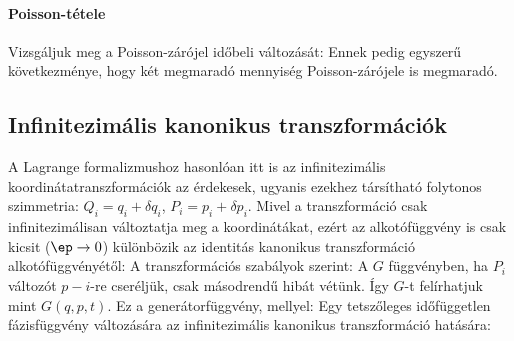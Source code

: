    \paragraph{Poisson-tétele}
   
   Vizsgáljuk meg a Poisson-zárójel időbeli változását:
   Ennek pedig egyszerű következménye, hogy két megmaradó mennyiség Poisson-zárójele is megmaradó.
   
  \subsection{Infinitezimális kanonikus transzformációk}
   
   A Lagrange formalizmushoz hasonlóan itt is az infinitezimális koordinátatranszformációk az érdekesek, ugyanis ezekhez társítható folytonos szimmetria: $Q_i=q_i+\delta q_i$, $P_i=p_i+\delta p_i$.
   Mivel a transzformáció csak infinitezimálisan változtatja meg a koordinátákat, ezért az alkotófüggvény is csak kicsit ($\ep\to 0$) különbözik az identitás kanonikus transzformáció alkotófüggvényétől:
   A transzformációs szabályok szerint:
   A $G$ függvényben, ha $P_i$ változót $p-i$-re cseréljük, csak másodrendű hibát vétünk. Így $G$-t felírhatjuk mint $G(q,p,t)$.
   Ez a generátorfüggvény, mellyel:
   Egy tetszőleges időfüggetlen fázisfüggvény változására az infinitezimális kanonikus transzformáció hatására:
   
